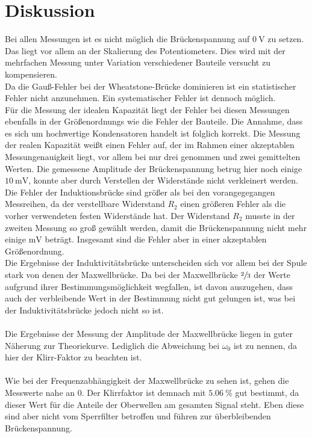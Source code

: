 \section{Diskussion}
\label{sec:Diskussion}
Bei allen Messungen ist es nicht möglich die Brückenspannung auf $\SI{0}{\volt}$
zu setzen. Das liegt vor allem an der Skalierung des Potentiometers.
Dies wird mit der mehrfachen Messung unter Variation verschiedener Bauteile versucht
zu kompensieren.
\\
Da die Gauß-Fehler bei der Wheatstone-Brücke dominieren ist ein statistischer Fehler nicht anzunehmen.
Ein systematischer Fehler ist dennoch möglich.
\\
Für die Messung der idealen Kapazität liegt der Fehler bei diesen Messungen ebenfalls in der Größenordnungs wie die Fehler
der Bauteile. Die Annahme, dass es sich um hochwertige Kondensatoren handelt ist folglich korrekt.
Die Messung der realen Kapazität weißt einen Fehler auf, der im Rahmen einer akzeptablen Messungenauigkeit liegt,
vor allem bei nur drei genommen und zwei gemittelten Werten.
Die gemessene Amplitude der Brückenspannung betrug hier noch einige $\SI{10}{\milli\volt}$,
konnte aber durch Verstellen der Widerstände nicht verkleinert werden.
\\
Die Fehler der Induktionsbrücke sind größer als bei den vorangegegangen Messreihen,
da der verstellbare Widerstand $R_2$ einen größeren Fehler
als die vorher verwendeten festen Widerstände hat.
Der Widerstand $R_2$ musste in der zweiten Messung so groß gewählt werden,
damit die Brückenspannung nicht mehr einige $\si{\milli\volt}$ beträgt.
Insgesamt sind die Fehler aber in einer akzeptablen Größenordnung.
\\
Die Ergebnisse der Induktivitätsbrücke unterscheiden sich vor allem bei der Spule
stark von denen der Maxwellbrücke. Da bei der Maxwellbrücke $\sfrac{2}{3}$ der Werte
aufgrund ihrer Bestimmungsmöglichkeit wegfallen, ist davon auszugehen, dass auch
der verbleibende Wert in der Bestimmung nicht gut gelungen ist, was bei der
Induktivitätsbrücke jedoch nicht so ist.
\\\\
Die Ergebnisse der Messung der Amplitude der Maxwellbrücke liegen in guter Näherung
zur Theoriekurve. Lediglich die Abweichung bei $ω_0$ ist zu nennen, da hier der
Klirr-Faktor zu beachten ist.
\\\\
Wie bei der Frequenzabhängigkeit der Maxwellbrücke zu sehen ist, gehen die Messwerte nahe an 0.
Der Klirrfaktor ist demnach mit $\SI{5.06}{\percent}$ gut bestimmt, da dieser Wert für die Anteile der Oberwellen am gesamten Signal steht.
Eben diese sind aber nicht vom Sperrfilter betroffen und führen zur überbleibenden Brückenspannung. 
